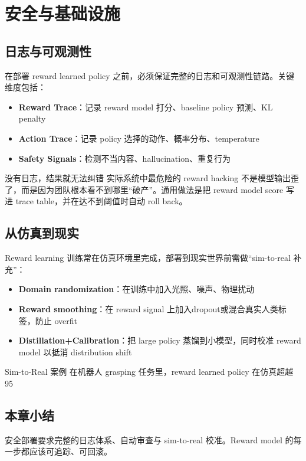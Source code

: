 \section{安全与基础设施}

\subsection{日志与可观测性}

在部署 reward learned policy 之前，必须保证完整的日志和可观测性链路。关键维度包括：

\begin{itemize}
    \item \textbf{Reward Trace}：记录 reward model 打分、baseline policy 预测、KL penalty
    \item \textbf{Action Trace}：记录 policy 选择的动作、概率分布、temperature
    \item \textbf{Safety Signals}：检测不当内容、hallucination、重复行为
\end{itemize}

\begin{warningbox}{没有日志，结果就无法纠错}
实际系统中最危险的 reward hacking 不是模型输出歪了，而是因为团队根本看不到哪里“破产”。通用做法是把 reward model score 写进 trace table，并在达不到阈值时自动 roll back。
\end{warningbox}

\subsection{从仿真到现实}

Reward learning 训练常在仿真环境里完成，部署到现实世界前需做“sim-to-real 补充”：

\begin{itemize}
    \item \textbf{Domain randomization}：在训练中加入光照、噪声、物理扰动
    \item \textbf{Reward smoothing}：在 reward signal 上加入dropout或混合真实人类标签，防止 overfit
    \item \textbf{Distillation+Calibration}：把 large policy 蒸馏到小模型，同时校准 reward model 以抵消 distribution shift
\end{itemize}

\begin{knowledgebox}{Sim-to-Real 案例}
在机器人 grasping 任务里，reward learned policy 在仿真超越 95%
\end{knowledgebox}

\subsection{本章小结}

安全部署要求完整的日志体系、自动审查与 sim-to-real 校准。Reward model 的每一步都应该可追踪、可回滚。

